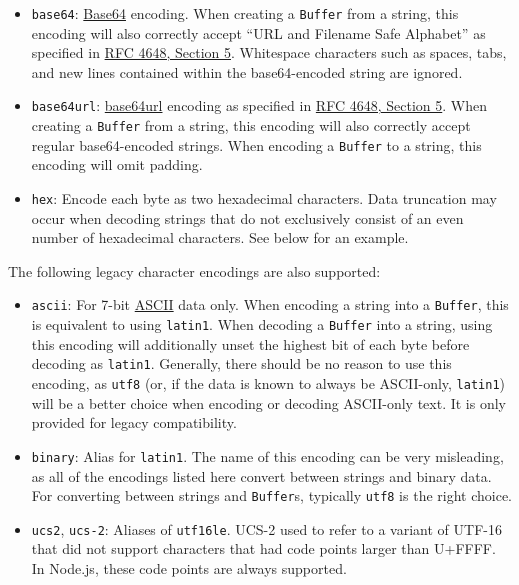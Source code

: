 \begin{itemize}
\item
  \texttt{\textquotesingle{}base64\textquotesingle{}}:
  \href{https://en.wikipedia.org/wiki/Base64}{Base64} encoding. When
  creating a \texttt{Buffer} from a string, this encoding will also
  correctly accept ``URL and Filename Safe Alphabet'' as specified in
  \href{https://tools.ietf.org/html/rfc4648\#section-5}{RFC 4648,
  Section 5}. Whitespace characters such as spaces, tabs, and new lines
  contained within the base64-encoded string are ignored.
\item
  \texttt{\textquotesingle{}base64url\textquotesingle{}}:
  \href{https://tools.ietf.org/html/rfc4648\#section-5}{base64url}
  encoding as specified in
  \href{https://tools.ietf.org/html/rfc4648\#section-5}{RFC 4648,
  Section 5}. When creating a \texttt{Buffer} from a string, this
  encoding will also correctly accept regular base64-encoded strings.
  When encoding a \texttt{Buffer} to a string, this encoding will omit
  padding.
\item
  \texttt{\textquotesingle{}hex\textquotesingle{}}: Encode each byte as
  two hexadecimal characters. Data truncation may occur when decoding
  strings that do not exclusively consist of an even number of
  hexadecimal characters. See below for an example.
\end{itemize}

The following legacy character encodings are also supported:

\begin{itemize}
\item
  \texttt{\textquotesingle{}ascii\textquotesingle{}}: For 7-bit
  \href{https://en.wikipedia.org/wiki/ASCII}{ASCII} data only. When
  encoding a string into a \texttt{Buffer}, this is equivalent to using
  \texttt{\textquotesingle{}latin1\textquotesingle{}}. When decoding a
  \texttt{Buffer} into a string, using this encoding will additionally
  unset the highest bit of each byte before decoding as
  \texttt{\textquotesingle{}latin1\textquotesingle{}}. Generally, there
  should be no reason to use this encoding, as
  \texttt{\textquotesingle{}utf8\textquotesingle{}} (or, if the data is
  known to always be ASCII-only,
  \texttt{\textquotesingle{}latin1\textquotesingle{}}) will be a better
  choice when encoding or decoding ASCII-only text. It is only provided
  for legacy compatibility.
\item
  \texttt{\textquotesingle{}binary\textquotesingle{}}: Alias for
  \texttt{\textquotesingle{}latin1\textquotesingle{}}. The name of this
  encoding can be very misleading, as all of the encodings listed here
  convert between strings and binary data. For converting between
  strings and \texttt{Buffer}s, typically
  \texttt{\textquotesingle{}utf8\textquotesingle{}} is the right choice.
\item
  \texttt{\textquotesingle{}ucs2\textquotesingle{}},
  \texttt{\textquotesingle{}ucs-2\textquotesingle{}}: Aliases of
  \texttt{\textquotesingle{}utf16le\textquotesingle{}}. UCS-2 used to
  refer to a variant of UTF-16 that did not support characters that had
  code points larger than U+FFFF. In Node.js, these code points are
  always supported.
\end{itemize}

